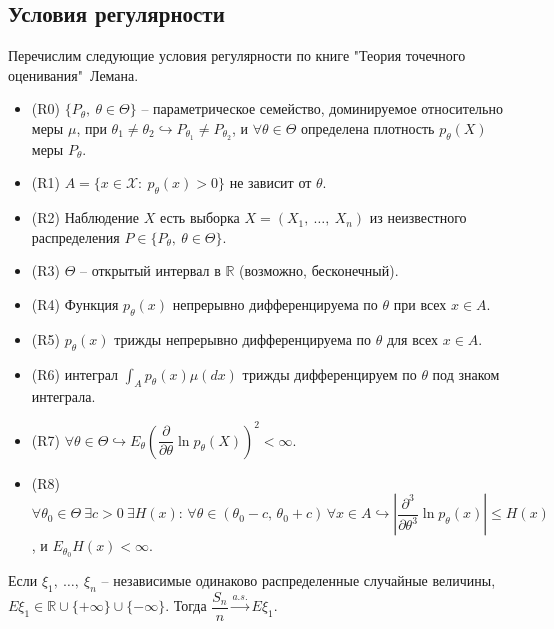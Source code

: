 \subsection{Условия регулярности}

Перечислим следующие условия регулярности по книге "Теория точечного оценивания"\, Лемана.
\begin{itemize}
    \item (R0) $\displaystyle \{P_{\theta } ,\ \theta \in \Theta \}$ -- параметрическое семейство, доминируемое относительно меры $\displaystyle \mu $, при $\displaystyle \theta _{1} \neq \theta _{2} \hookrightarrow P_{\theta _{1}} \neq P_{\theta _{2}}$, и $\displaystyle \forall \theta \in \Theta $ определена плотность $\displaystyle p_{\theta }( X)$ меры $\displaystyle P_{\theta }$.
    \item (R1) $\displaystyle A=\{x\in \mathcal{X} :\ p_{\theta }( x)  >0\}$ не зависит от $\displaystyle \theta $.
    \item (R2) Наблюдение $\displaystyle X$ есть выборка $\displaystyle X=( X_{1} ,\ \dotsc ,\ X_{n})$ из неизвестного распределения $\displaystyle P\in \{P_{\theta } ,\ \theta \in \Theta \}$.
    \item (R3) $\displaystyle \Theta $ -- открытый интервал в $\displaystyle \mathbb{R}$ (возможно, бесконечный).
    \item (R4) Функция $\displaystyle p_{\theta }(x)$ непрерывно дифференцируема по $\displaystyle \theta $ при всех $\displaystyle x\in A$.
    \item (R5) $\displaystyle p_{\theta }( x)$ трижды непрерывно дифференцируема по $\theta$ для всех $x \in A$.
    \item (R6) интеграл $\displaystyle \int _{A} p_{\theta }( x) \mu ( dx)$ трижды дифференцируем по $\displaystyle \theta $ под знаком интеграла.
    \item (R7) $\forall \theta\in\Theta \hookrightarrow \displaystyle E_{\theta }\left(\dfrac{\partial }{\partial \theta }\ln p_{\theta }( X)\right)^{2} < \infty$.
    \item (R8) $\displaystyle \forall \theta _{0} \in \Theta \ \exists c >0\ \exists H(x):\, \forall \theta \in (\theta_0 - c,\, \theta_0 + c)\, \forall x \in A \hookrightarrow \left| \dfrac{\partial ^{3}}{\partial \theta ^{3}}\ln p_{\theta }(x)\right| \leqslant H(x)$, и $\displaystyle E_{\theta _{0}} H(x) < \infty $.
\end{itemize}
\begin{lemma}
    Если $\displaystyle \xi _{1} ,\ \dotsc ,\ \xi _{n}$ -- независимые одинаково распределенные случайные величины, $\displaystyle E\xi _{1} \in \mathbb{R} \cup \{+\infty \} \cup \{-\infty \}$. Тогда $\displaystyle \dfrac{S_{n}}{n}\xrightarrow{a.s.} E\xi _{1}$.
\end{lemma}
